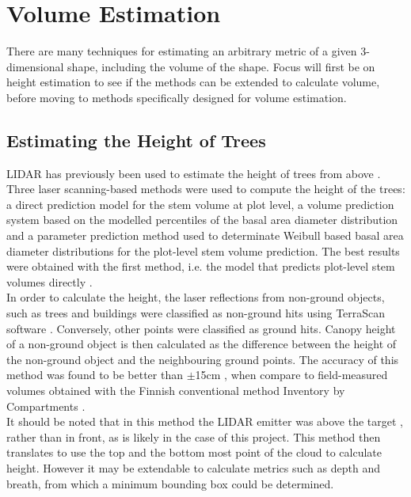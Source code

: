 \section{Volume Estimation}
\label{design:volume estimation}
There are many techniques for estimating an arbitrary metric of a given 3-dimensional shape, including the volume of the shape.
Focus will first be on height estimation to see if the methods can be extended to calculate volume, before moving to methods specifically designed for volume estimation.\\

\subsection{Estimating the Height of Trees}
LIDAR has previously been used to estimate the height of trees from above \cite{Maltamo2006}. Three laser scanning-based methods were used to compute the height of the trees: a direct prediction model for the stem volume at plot level, a volume prediction system based on the modelled percentiles of the basal area diameter distribution and a parameter prediction method used to determinate Weibull based basal area diameter distributions \cite{Frechet1927} for the plot-level stem volume prediction. The best results were obtained with the first method, i.e. the model that predicts plot-level stem volumes directly \cite{Maltamo2006}.\\

In order to calculate the height, the laser reflections from non-ground objects, such as trees and buildings were classified as non-ground hits using TerraScan software \cite{Solid2013}. Conversely, other points were classified as ground hits. Canopy height of a non-ground object is then calculated as the difference between the height of the non-ground object and the neighbouring ground points. The accuracy of this method was found to be better than $\pm$15cm \cite{Maltamo2006}, when compare to field-measured volumes obtained with the Finnish conventional method Inventory by Compartments \cite{Koivuniemi2006}.\\

It should be noted that in this method the LIDAR emitter was above the target \cite{Maltamo2006}, rather than in front, as is likely in the case of this project. This method then translates to use the top and the bottom most point of the cloud to calculate height. However it may be extendable to calculate metrics such as depth and breath, from which a minimum bounding box could be determined.\\

